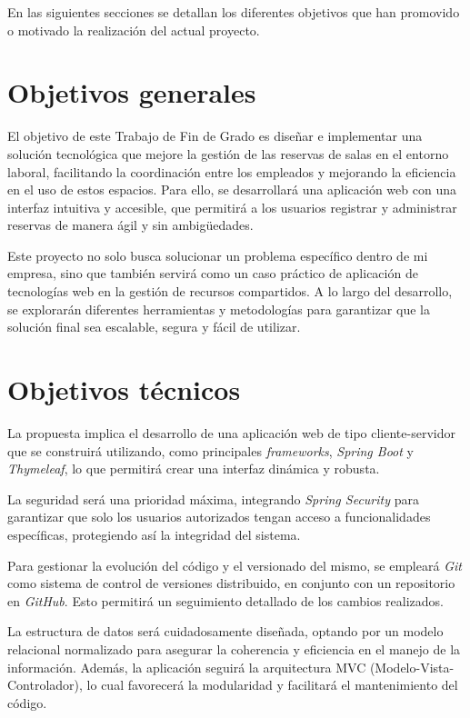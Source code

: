 
En las siguientes secciones se detallan los diferentes objetivos que han promovido o motivado la realización del actual proyecto.

\section{Objetivos generales}\label{objetivos-generales}
El objetivo de este Trabajo de Fin de Grado es diseñar e implementar una solución tecnológica que mejore la gestión de las reservas de salas en el entorno laboral, facilitando la coordinación entre los empleados y mejorando la eficiencia en el uso de estos espacios. Para ello, se desarrollará una aplicación web con una interfaz intuitiva y accesible, que permitirá a los usuarios registrar y administrar reservas de manera ágil y sin ambigüedades.

Este proyecto no solo busca solucionar un problema específico dentro de mi empresa, sino que también servirá como un caso práctico de aplicación de tecnologías web en la gestión de recursos compartidos. A lo largo del desarrollo, se explorarán diferentes herramientas y metodologías para garantizar que la solución final sea escalable, segura y fácil de utilizar.

\section{Objetivos técnicos}\label{objetivos-tecnicos}
La propuesta implica el desarrollo de una aplicación web de tipo cliente-servidor que se construirá utilizando, como principales \emph{frameworks}, \textit{Spring Boot} y \textit{Thymeleaf}, lo que permitirá crear una interfaz dinámica y robusta.

La seguridad será una prioridad máxima, integrando \textit{Spring Security} para garantizar que solo los usuarios autorizados tengan acceso a funcionalidades específicas, protegiendo así la integridad del sistema.

Para gestionar la evolución del código y el versionado del mismo, se empleará \textit{Git} como sistema de control de versiones distribuido, en conjunto con un repositorio en \textit{GitHub}. Esto permitirá un seguimiento detallado de los cambios realizados.

La estructura de datos será cuidadosamente diseñada, optando por un modelo relacional normalizado para asegurar la coherencia y eficiencia en el manejo de la información. Además, la aplicación seguirá la arquitectura MVC (Modelo-Vista-Controlador), lo cual favorecerá la modularidad y facilitará el mantenimiento del código.

